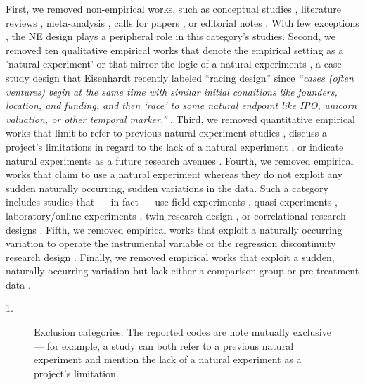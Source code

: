 First, we removed non-empirical works, such as conceptual studies 
\parencite[e.g.,][]{eden2021}, literature reviews
\parencite[e.g.,][]{shaver2020}, meta-analysis
\parencite[e.g.,][]{geyskens2006}, calls for papers
\parencite[e.g.,][]{jacquart2020}, or editorial notes
\parencite[e.g.,][]{breschi2020}. With few exceptions
\parencite[e.g.,][]{sieweke2020}, the NE design plays a peripheral role in this
category's studies. Second, we removed ten qualitative empirical works that 
denote the empirical setting as a 'natural experiment' \parencite[][]{} or that mirror
the logic of a natural experiments \parencite[e.g.,][]{powell2017}, a case study
design that Eisenhardt recently labeled ``racing design'' since \textit{``cases
(often ventures) begin at the same time with similar initial conditions like
founders, location, and funding, and then `race' to some natural endpoint like
IPO, unicorn valuation, or other temporal marker.''} \parencite[page
150,][]{eisenhardt2021}.  Third, we removed quantitative empirical works that limit to refer
to previous natural experiment studies \parencite[e.g.,][]{stevens2021}, discuss
a project's limitations in regard to the lack of a natural experiment
\parencite[e.g.,][]{chen2020}, or indicate natural experiments as a future
research avenues \parencite[e.g.,][]{xie0000}.  Fourth, we removed empirical
works that claim to use a natural experiment whereas they do not exploit any
sudden naturally occurring, sudden variations in the data. Such a category
includes studies that --- in fact --- use field experiments
\parencite[e.g.,][]{lee2017}, quasi-experiments
\parencite[e.g.,][]{azoulay2014}, laboratory/online experiments
\parencite[e.g.,][]{laurieromartinez2014}, twin research design
\parencite[e.g.,][]{nicolaou2008}, or correlational research designs
\parencite[e.g.,][]{boyle2011}. Fifth, we removed empirical works that exploit a
naturally occurring variation to operate the instrumental variable
\parencite[e.g.,][]{zolotoy2018} or the regression discontinuity research design
\parencite[e.g.,][]{flammer2015}.  Finally, we removed empirical works that
exploit a sudden, naturally-occurring  variation but lack either a comparison
group \parencite[e.g.][]{corbo2016} or pre-treatment data
\parencite[e.g.,][]{desjardine2019}.

\ref{fig:exclusion_causes}. 

\begin{figure}
    \centering
    \sffamily
    \begin{small}
        \begin{center}
            
        \end{center}
        \caption{Exclusion categories. The reported codes are note mutually exclusive
        --- for example, a study can both refer to a previous natural experiment
        and mention the lack of a natural experiment as a project's limitation.}
        \label{fig:exclusion_causes}
    \end{small}
\end{figure}
